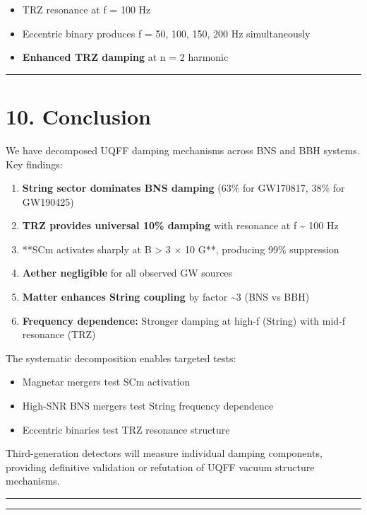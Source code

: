\documentclass[11pt]{article}
\begin{document}
\begin{itemize}
  \item TRZ resonance at f = 100 Hz
  \item Eccentric binary produces f = 50, 100, 150, 200 Hz simultaneously
  \item \textbf{Enhanced TRZ damping} at n = 2 harmonic
\end{itemize}

\noindent\rule{\textwidth}{0.4pt}

\section*{10. Conclusion}

We have decomposed UQFF damping mechanisms across BNS and BBH systems. Key findings:

\begin{enumerate}
  \item \textbf{String sector dominates BNS damping} (63\% for GW170817, 38\% for GW190425)
  \item \textbf{TRZ provides universal 10\% damping} with resonance at f \textasciitilde{} 100 Hz
  \item **SCm activates sharply at B > 3 $\times$ 10 G**, producing 99\% suppression
  \item \textbf{Aether negligible} for all observed GW sources
  \item \textbf{Matter enhances String coupling} by factor \textasciitilde{}3 (BNS vs BBH)
  \item \textbf{Frequency dependence:} Stronger damping at high-f (String) with mid-f resonance (TRZ)
\end{enumerate}

The systematic decomposition enables targeted tests:

\begin{itemize}
  \item Magnetar mergers test SCm activation
  \item High-SNR BNS mergers test String frequency dependence
  \item Eccentric binaries test TRZ resonance structure
\end{itemize}

Third-generation detectors will measure individual damping components, providing definitive validation or refutation of UQFF vacuum structure mechanisms.

\noindent\rule{\textwidth}{0.4pt}

\noindent\rule{\textwidth}{0.4pt}
\end{document}
